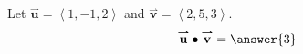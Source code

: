 \documentclass{ximera}
\author{Gregory Hartman \and Matthew Carr}
\begin{document}
\begin{exercise}
Let $\overset{\boldsymbol{\rightharpoonup}}{\mathbf{u}} = \left< 1,-1,2 \right>$ and $\overset{\boldsymbol{\rightharpoonup}}{\mathbf{v}} = \left< 2,5,3 \right>$.
\[
\overset{\boldsymbol{\rightharpoonup}}{\mathbf{u}} \bullet \overset{\boldsymbol{\rightharpoonup}}{\mathbf{v}} = \answer{3}
\]
\end{exercise}
\end{document}
